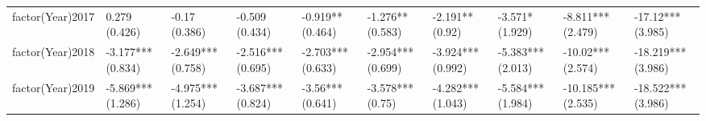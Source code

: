 \begin{table}[ht]
\begin{tabular}{llllllllll}
  factor(Year)2017 & 0.279 (0.426) & -0.17 (0.386) & -0.509 (0.434) & -0.919** (0.464) & -1.276** (0.583) & -2.191** (0.92) & -3.571* (1.929) & -8.811*** (2.479) & -17.12*** (3.985) \\ 
  factor(Year)2018 & -3.177*** (0.834) & -2.649*** (0.758) & -2.516*** (0.695) & -2.703*** (0.633) & -2.954*** (0.699) & -3.924*** (0.992) & -5.383*** (2.013) & -10.02*** (2.574) & -18.219*** (3.986) \\ 
  factor(Year)2019 & -5.869*** (1.286) & -4.975*** (1.254) & -3.687*** (0.824) & -3.56*** (0.641) & -3.578*** (0.75) & -4.282*** (1.043) & -5.584*** (1.984) & -10.185*** (2.535) & -18.522*** (3.986) \\ 
   \bottomrule
\end{tabular}
\endgroup
\end{table}
